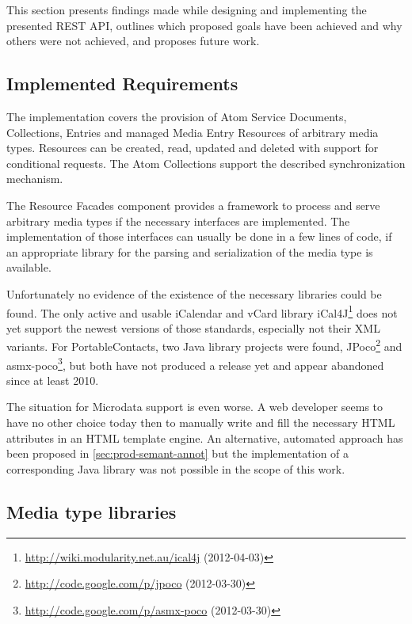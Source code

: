 \documentclass[11pt,a4paper,headsepline,twoside]{scrartcl}		%
\newcommand{\citeurl}[2]{\url{#1} (#2)}
\begin{document}

This section presents findings made while designing and implementing the
presented REST API, outlines which proposed goals have been achieved and why
others were not achieved, and proposes future work.

\subsection{Implemented Requirements}
\label{sec:impl-requ}

The implementation covers the provision of Atom Service Documents, Collections,
Entries and managed Media Entry Resources of arbitrary media types. Resources can
be created, read, updated and deleted with support for conditional requests. The
Atom Collections support the described synchronization mechanism.

The Resource Facades component provides a framework to process and serve
arbitrary media types if the necessary interfaces are implemented. The
implementation of those interfaces can usually be done in a few lines of code,
if an appropriate library for the parsing and serialization of the media type is
available.

Unfortunately no evidence of the existence of the necessary libraries could be
found. The only active and usable iCalendar and vCard library
iCal4J\footnote{\citeurl{http://wiki.modularity.net.au/ical4j}{2012-04-03}} does
not yet support the newest versions of those standards, especially not their XML
variants. For PortableContacts, two Java library projects were found,
JPoco\footnote{\citeurl{http://code.google.com/p/jpoco}{2012-03-30}} and
asmx-poco\footnote{\citeurl{http://code.google.com/p/asmx-poco}{2012-03-30}},
but both have not produced a release yet and appear abandoned since at least
2010.

The situation for Microdata support is even worse. A web developer seems to have
no other choice today then to manually write and fill the necessary HTML
attributes in an HTML template engine. An alternative, automated approach has
been proposed in \autoref{sec:prod-semant-annot} but the implementation of a
corresponding Java library was not possible in the scope of this work.

\subsection{Media type libraries}
\label{sec:mediatype-libraries}
\end{document}
